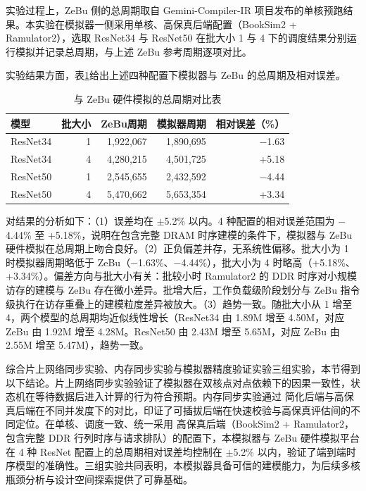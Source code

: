 实验过程上，ZeBu 侧的总周期取自 Gemini-Compiler-IR 项目发布的单核预跑结果。本实验在模拟器一侧采用单核、高保真后端配置（BookSim2 + Ramulator2），选取 ResNet34 与 ResNet50 在批大小 1 与 4 下的调度结果分别运行模拟并记录总周期，与上述 ZeBu 参考周期逐项对比。

实验结果方面，表\ref{tab:zebu_validation}给出上述四种配置下模拟器与 ZeBu 的总周期及相对误差。

\begin{table}[H]
  \centering
  \caption{与 ZeBu 硬件模拟的总周期对比表}
  \label{tab:zebu_validation}
  \small
  \begin{tabular*}{\textwidth}{@{\extracolsep{\fill}}lrrrr}
    \toprule
    模型 & 批大小 & ZeBu周期 & 模拟器周期 & 相对误差（\%） \\
    \midrule
    ResNet34 & 1  & 1,922,067 & 1,890,695 & $-$1.63 \\
    ResNet34 & 4  & 4,280,215 & 4,501,725 & +5.18 \\
    ResNet50 & 1  & 2,545,655 & 2,432,592 & $-$4.44 \\
    ResNet50 & 4  & 5,470,662 & 5,653,354 & +3.34 \\
    \bottomrule
  \end{tabular*}
\end{table}

对结果的分析如下：（1）误差均在 $\pm$5.2\% 以内。4 种配置的相对误差范围为 $-$4.44\% 至 +5.18\%，说明在包含完整 DRAM 时序建模的条件下，模拟器与 ZeBu 硬件模拟在总周期上吻合良好。（2）正负偏差并存，无系统性偏移。批大小为 1 时模拟器周期略低于 ZeBu（$-$1.63\%、$-$4.44\%），批大小为 4 时略高（+5.18\%、+3.34\%）。偏差方向与批大小有关：批较小时 Ramulator2 的 DDR 时序对小规模访存的建模与 ZeBu 存在微小差异。批增大后，工作负载级阶段划分与 ZeBu 指令级执行在访存重叠上的建模粒度差异被放大。（3）趋势一致。随批大小从 1 增至 4，两个模型的总周期均近似线性增长（ResNet34 由 1.89M 增至 4.50M，对应 ZeBu 由 1.92M 增至 4.28M。ResNet50 由 2.43M 增至 5.65M，对应 ZeBu 由 2.55M 增至 5.47M），趋势一致。


综合片上网络同步实验、内存同步实验与模拟器精度验证实验三组实验，本节得到以下结论。片上网络同步实验验证了模拟器在双核点对点依赖下的因果一致性，状态机在等待数据后进入计算的行为符合预期。内存同步实验通过 简化后端与高保真后端在不同并发度下的对比，印证了可插拔后端在快速校验与高保真评估间的不同定位。在单核、调度一致、统一采用 高保真后端（BookSim2 + Ramulator2，包含完整 DDR 行列时序与请求排队）的配置下，本模拟器与 ZeBu 硬件模拟平台在 4 种 ResNet 配置上的总周期相对误差均控制在 $\pm$5.2\% 以内，验证了端到端时序模型的准确性。三组实验共同表明，本模拟器具备可信的建模能力，为后续多核瓶颈分析与设计空间探索提供了可靠基础。


